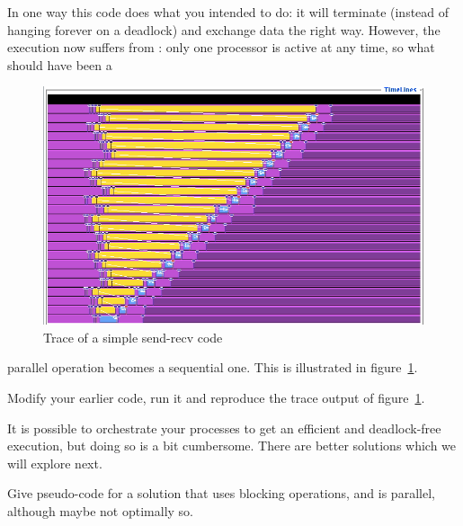 In one way this code does what you intended to do:
it will terminate (instead of hanging forever on a
deadlock) and exchange data the right way. However, the execution
now suffers from : only
one processor is active at any time, so what should have been a
\begin{figure}[ht]
\includegraphics[scale=.4]{graphics-public/linear-serial}
\caption{Trace of a simple send-recv code}
\label{fig:serialization}
\end{figure}
parallel operation becomes a sequential one. This is illustrated in
figure~\ref{fig:serialization}.
\begin{exercise}
\label{ex:linear-sequential}
  Modify your earlier code, run it and reproduce the trace output 
  of figure~\ref{fig:serialization}.
\end{exercise}
It is possible to orchestrate your processes to get an efficient and
deadlock-free execution, but doing so is a bit cumbersome.
There are better solutions which we will
explore next.

\begin{exercise}
  Give pseudo-code for a solution that uses blocking operations, and is
  parallel, although maybe not optimally so.
\end{exercise}

